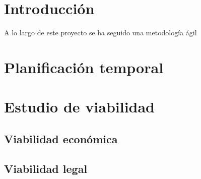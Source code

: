 
\section{Introducción}
A lo largo de este proyecto se ha seguido una metodología ágil


\section{Planificación temporal}

\section{Estudio de viabilidad}

\subsection{Viabilidad económica}

\subsection{Viabilidad legal}


